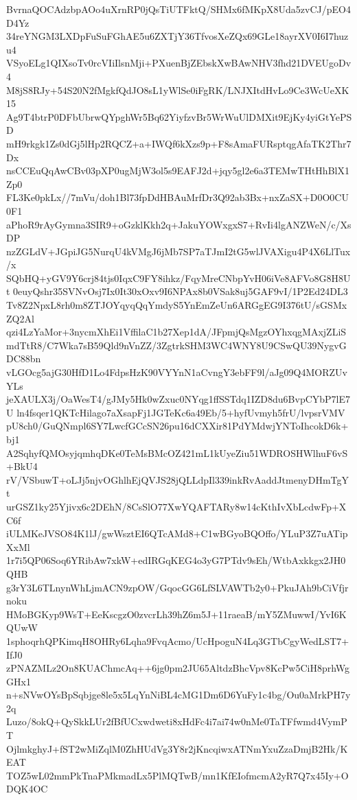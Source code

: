 BvrnaQOCAdzbpAOo4uXrnRP0jQsTiUTFktQ/SHMx6fMKpX8Uda5zvCJ/pEO4D4Yz
34reYNGM3LXDpFuSuFGhAE5u6ZXTjY36TfvosXeZQx69GLe18ayrXV0I6I7huzu4
VSyoELg1QIXsoTv0rcVIiIlsnMji+PXuenBjZEbskXwBAwNHV3fhd21DVEUgoDv4
M8jS8RJy+54S20N2fMgkfQdJO8sL1yWlSe0iFgRK/LNJXItdHvLo9Ce3WcUeXK15
Ag9T4btrP0DFbUbrwQYpghWr5Bq62YiyfzvBr5WrWuUlDMXit9EjKy4yiGtYePSD
mH9rkgk1Zs0dGj5lHp2RQCZ+a+IWQf6kXzs9p+F8sAmaFURsptqgAfaTK2Thr7Dx
nsCCEuQqAwCBv03pXP0ugMjW3ol5s9EAFJ2d+jqy5gl2e6a3TEMwTHtHhBlX1Zp0
FL3Ke0pkLx//7mVu/doh1Bl73fpDdHBAuMrfDr3Q92ab3Bx+nxZaSX+D0O0CU0F1
aPhoR9rAyGymna3SIR9+oGzklKkh2q+JakuYOWxgxS7+RvIi4lgANZWeN/c/XsDP
nzZGLdV+JGpiJG5NurqU4kVMgJ6jMb7SP7aTJmI2tG5wlJVAXigu4P4X6LlTux/x
SQbHQ+yGV9Y6crj84tjs0IqxC9FY8ihkz/FqyMreCNbpYvH06iVe8AFVo8G8H8Ut
0euyQshr35SVNvOsj7Ix0It30xOxv9I6NPAx8b0VSak8uj5GAF9vI/1P2Ed24DL3
Tv8Z2NpxL8rh0m8ZTJOYqyqQqYmdyS5YnEmZeUn6ARGgEG9I376tU/sGSMxZQ2Al
qzi4LzYaMor+3nycmXhEi1VffilaC1b27Xep1dA/JFpmjQsMgzOYhxqgMAxjZLiS
mdTtR8/C7Wka7sB59Qld9nVnZZ/3ZgtrkSHM3WC4WNY8U9CSwQU39NygvGDC88bn
vLGOcg5ajG30HfD1Lo4FdpsHzK90VYYnN1aCvngY3ebFF9l/aJg09Q4MORZUvYLs
jeXAULX3j/OaWesT4/gJMy5Hk0wZxuc0NYqg1ffSSTdq1IZD8du6BvpCYbP7lE7U
ln4fsqer1QKTcHilago7aXsapFj1JGTeKc6a49Eb/5+hyfUvmyh5frU/lvpsrVMV
pU8ch0/GuQNmpl6SY7LwcfGCcSN26pu16dCXXir81PdYMdwjYNToIhcokD6k+bj1
A2SqhyfQMOsyjqmhqDKe0TeMsBMcOZ421mL1kUyeZiu51WDROSHWlhuF6vS+BkU4
rV/VSbuwT+oLJj5njvOGhlhEjQVJS28jQLLdpIl339inkRvAaddJtmenyDHmTgYt
urGSZ1ky25Yjivx6c2DEhN/8CsSlO77XwYQAFTARy8w14cKthIvXbLcdwFp+XC6f
iULMKeJVSO84K1lJ/gwWsztEI6QTcAMd8+C1wBGyoBQOffo/YLuP3Z7uATipXxMl
1r7i5QP06Soq6YRibAw7xkW+edIRGqKEG4o3yG7PTdv9sEh/WtbAxkkgx2JH0QHB
g3rY3L6TLnynWhLjmACN9zpOW/GqocGG6LfSLVAWTb2y0+PkuJAh9bCiVfjrnoku
HMoBGKyp9WsT+EeKscgzO0zvcrLh39hZ6m5J+11raeaB/mY5ZMuwwI/YvI6KQUwW
1sphoqrhQPKimqH8OHRy6Lqha9FvqAcmo/UcHpoguN4Lq3GTbCgyWedLST7+IfJ0
zPNAZMLz2On8KUAChmcAq++6jg0pm2JU65AltdzBhcVpv8KcPw5CiH8prhWgGHx1
n+sNVwOYsBpSqbjge8le5x5LqYnNiBL4cMG1Dm6D6YuFy1c4bg/Ou0aMrkPH7y2q
Luzo/8okQ+QySkkLUr2fBfUCxwdweti8xHdFc4i7ai74w0nMe0TaTFfwmd4VymPT
OjlmkghyJ+fST2wMiZqlM0ZhHUdVg3Y8r2jKncqiwxATNmYxuZzaDmjB2Hk/KEAT
TOZ5wL02mmPkTnaPMkmadLx5PlMQTwB/mn1KfEIofmcmA2yR7Q7x45Iy+ODQK4OC
